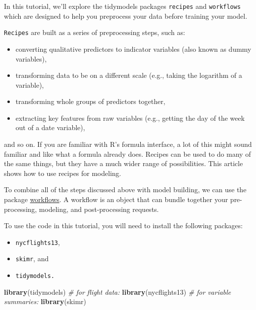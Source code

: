 \documentclass[
]{book}
\newenvironment{Shaded}{\begin{snugshade}}{\end{snugshade}}
\newcommand{\CommentTok}[1]{\textcolor[rgb]{0.56,0.35,0.01}{\textit{#1}}}
\newcommand{\KeywordTok}[1]{\textcolor[rgb]{0.13,0.29,0.53}{\textbf{#1}}}
\newcommand{\NormalTok}[1]{#1}
\providecommand{\tightlist}{%
  \setlength{\itemsep}{0pt}\setlength{\parskip}{0pt}}
\begin{document}
In this tutorial, we'll explore the tidymodels packages \texttt{recipes} and \texttt{workflows} which are designed to help you preprocess your data before training your model.

\texttt{Recipes} are built as a series of preprocessing steps, such as:

\begin{itemize}
\tightlist
\item
  converting qualitative predictors to indicator variables (also known as dummy variables),
\item
  transforming data to be on a different scale (e.g., taking the logarithm of a variable),
\item
  transforming whole groups of predictors together,
\item
  extracting key features from raw variables (e.g., getting the day of the week out of a date variable),
\end{itemize}

and so on. If you are familiar with R's formula interface, a lot of this might sound familiar and like what a formula already does. Recipes can be used to do many of the same things, but they have a much wider range of possibilities. This article shows how to use recipes for modeling.

To combine all of the steps discussed above with model building, we can use the package \href{https://workflows.tidymodels.org}{workflows}. A workflow is an object that can bundle together your pre-processing, modeling, and post-processing requests.

To use the code in this tutorial, you will need to install the following packages:

\begin{itemize}
\tightlist
\item
  \texttt{nycflights13},
\item
  \texttt{skimr}, and
\item
  \texttt{tidymodels.}
\end{itemize}

\begin{Shaded}
\begin{Highlighting}[]
\KeywordTok{library}\NormalTok{(tidymodels)}
\CommentTok{\# for flight data:}
\KeywordTok{library}\NormalTok{(nycflights13)}
\CommentTok{\# for variable summaries:}
\KeywordTok{library}\NormalTok{(skimr)}
\end{Highlighting}
\end{Shaded}
\end{document}
